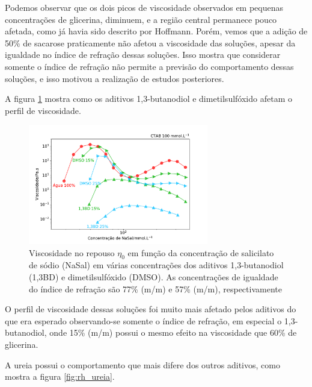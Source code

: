 			Podemos observar que os dois picos de viscosidade observados em pequenas concentrações de glicerina, diminuem, e a região central permanece pouco afetada, como já havia sido descrito por Hoffmann. Porém, vemos que a adição de 50\% de sacarose praticamente não afetou a viscosidade das soluções, apesar da igualdade no índice de refração dessas soluções. Isso mostra que considerar somente o índice de refração não permite a previsão do comportamento dessas soluções, e isso motivou a realização de estudos posteriores.
			
			A figura \ref{fig:rh_13bd_dmso} mostra como os aditivos 1,3-butanodiol e dimetilsulfóxido afetam o perfil de viscosidade.
			
			\begin{figure}[h]
				\centering
				\includegraphics[width=0.7\textwidth]{imagens/reologia/RH_13BD_DMSO}
				\caption{Viscosidade no repouso \(\eta_0\) em função da concentração de salicilato de sódio (NaSal) em várias concentrações dos aditivos 1,3-butanodiol (1,3BD) e dimetilsulfóxido (DMSO). As concentrações de igualdade do índice de refração são 77\% (m/m) e 57\% (m/m), respectivamente}
				\label{fig:rh_13bd_dmso}
			\end{figure}
		
			O perfil de viscosidade dessas soluções foi muito mais afetado pelos aditivos do que era esperado observando-se somente o índice de refração, em especial o 1,3-butanodiol, onde 15\% (m/m) possui o mesmo efeito na viscosidade que 60\% de glicerina.
			
			A ureia possui o comportamento que mais difere dos outros aditivos, como mostra a figura \ref{fig:rh_ureia}.
			
